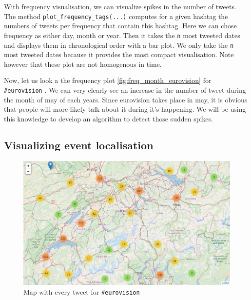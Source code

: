 \documentclass[11pt]{article}
\begin{document}
With frequency visualisation, we can visualize spikes in the number of tweets. The method \texttt{plot\_frequency\_tags(...)} computes for a given hashtag the numbers of tweets per frequency that contain this hashtag. Here we can chose frequency as either day, month or year. Then it takes the \texttt{n} most tweeted dates and displays them in chronological order with a bar plot. We only take the \texttt{n} most tweeted dates because it provides the most compact visualisation. Note however that these plot are not homogenous in time. 

Now, let us look a the frequency plot \ref{fig:freq_month_eurovision} for \texttt{\#eurovision} .
We can very clearly see an increase in the number of tweet during the month of may of each years. Since eurovision takes place in may, it is obvious that people will more likely talk about it during it's happening. We will be using this knowledge to develop an algorithm to detect those sudden spikes.

\subsection{Visualizing event localisation}

\begin{figure}[htbp]
  \vspace*{-1mm}
  \centering
  \includegraphics[width=\columnwidth]{figures/map_eurovision.png}
  \vspace{-5mm}
  \caption{Map with every tweet for \texttt{\#eurovision}}
  \label{fig:map:eurovision}
\end{figure}
\end{document}
